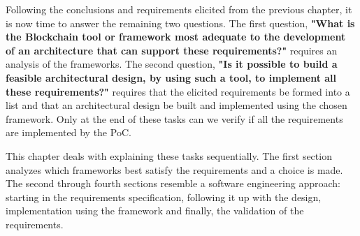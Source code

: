 

Following the conclusions and requirements elicited from the previous chapter, it is now time to answer the remaining two questions. The first question, \textbf{"What is the Blockchain tool or framework most adequate to the development of an architecture that can support these requirements?"} requires an analysis of the frameworks. The second question, \textbf{"Is it possible to build a feasible architectural design, by using such a tool, to implement all these requirements?"} requires that the elicited requirements be formed into a list and that an architectural design be built and implemented using the chosen framework. Only at the end of these tasks can we verify if all the requirements are implemented by the PoC.

This chapter deals with explaining these tasks sequentially. The first section analyzes which frameworks best satisfy the requirements and a choice is made. The second through fourth sections resemble a software engineering approach: starting in the requirements specification, following it up with the design, implementation using the framework and finally, the validation of the requirements.

%
